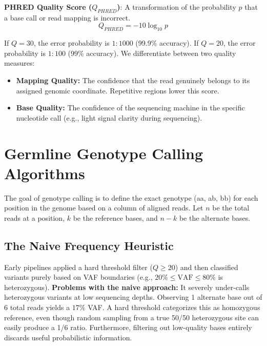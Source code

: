 \documentclass[11pt,a4paper]{article}
\newcommand{\sta}{\textbf{\textcolor{red}{\sffamily\upshape [!]}} }
\begin{document}
\begin{important}
    \textbf{PHRED Quality Score ($Q_{PHRED}$)}: A transformation of the probability $p$ that a base call or read mapping is incorrect.
    \[
    Q_{PHRED} = -10 \log_{10} p
    \]
\end{important}

If $Q=30$, the error probability is $1:1000$ (99.9\% accuracy). If $Q=20$, the error probability is $1:100$ (99\% accuracy). 
We differentiate between two quality measures:
\begin{itemize}
    \item \textbf{Mapping Quality:} The confidence that the read genuinely belongs to its assigned genomic coordinate. Repetitive regions lower this score.
    \item \textbf{Base Quality:} The confidence of the sequencing machine in the specific nucleotide call (e.g., light signal clarity during sequencing).
\end{itemize}


\section{Germline Genotype Calling Algorithms}
The goal of genotype calling is to define the exact genotype (aa, ab, bb) for each position in the genome based on a column of aligned reads. Let $n$ be the total reads at a position, $k$ be the reference bases, and $n-k$ be the alternate bases.

\subsection{The Naive Frequency Heuristic}
Early pipelines applied a hard threshold filter ($Q \geq 20$) and then classified variants purely based on VAF boundaries (e.g., $20\% \leq \text{VAF} \leq 80\%$ is heterozygous).
\sta \textbf{Problems with the naive approach:} It severely under-calls heterozygous variants at low sequencing depths. Observing 1 alternate base out of 6 total reads yields a $17\%$ VAF. A hard threshold categorizes this as homozygous reference, even though random sampling from a true 50/50 heterozygous site can easily produce a 1/6 ratio. Furthermore, filtering out low-quality bases entirely discards useful probabilistic information.
\end{document}
